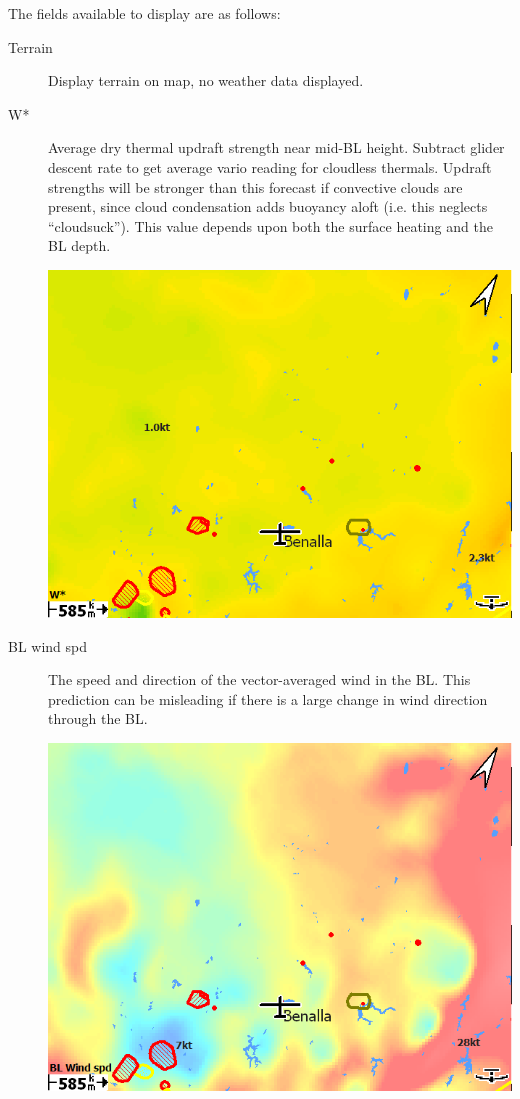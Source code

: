 \documentclass[a4paper,12pt]{refrep}
\begin{document}
The fields available to display are as follows:
\begin{description}
\item[Terrain] Display terrain on map, no weather data displayed.

\item[W*] 
Average dry thermal updraft strength near mid-BL height.  Subtract
glider descent rate to get average vario reading for cloudless
thermals.  Updraft strengths will be stronger than this forecast if
convective clouds are present, since cloud condensation adds buoyancy
aloft (i.e. this neglects ``cloudsuck'').  This value depends upon both
the surface heating and the BL depth.

\begin{center}
\includegraphics[angle=0,width=0.8\linewidth,keepaspectratio='true']{figures/rasp-wstar.png}
\end{center}

\item[BL wind spd] 
The speed and direction of the vector-averaged wind in the BL.  This
prediction can be misleading if there is a large change in wind
direction through the BL.

\begin{center}
\includegraphics[angle=0,width=0.8\linewidth,keepaspectratio='true']{figures/rasp-blwindspd.png}
\end{center}


\end{description}
\end{document}
